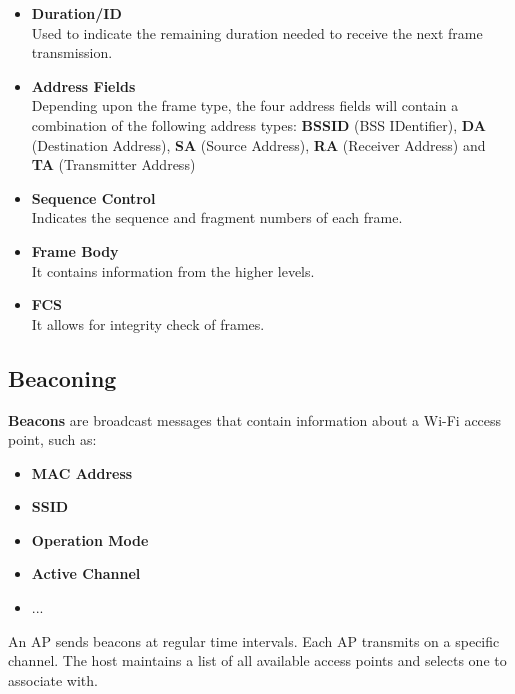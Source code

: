 \documentclass{article}
\begin{document}
\begin{itemize}
	\item \textbf{Duration/ID}
	\vspace{.2cm} \\
	Used to indicate the remaining duration needed to receive the next frame transmission.
	
	\item \textbf{Address Fields}
	\vspace{.2cm} \\
	Depending upon the frame type, the four address fields will contain a combination of the following address types: \textbf{BSSID} (BSS IDentifier), \textbf{DA} (Destination Address), \textbf{SA} (Source Address), \textbf{RA} (Receiver Address) and \textbf{TA} (Transmitter Address)
	
	\item \textbf{Sequence Control}
	\vspace{.2cm} \\
	Indicates the sequence and fragment numbers of each frame.
	
	\item \textbf{Frame Body}
	\vspace{.2cm} \\
	It contains information from the higher levels.
	
	\item \textbf{FCS}
	\vspace{.2cm} \\
	It allows for integrity check of frames.
\end{itemize}

\subsection{Beaconing}
\textbf{Beacons} are broadcast messages that contain information about a Wi-Fi access point, such as:

\begin{itemize}
	\item \textbf{MAC Address}
	\item \textbf{SSID}
	\item \textbf{Operation Mode}
	\item \textbf{Active Channel}
	\item ...
\end{itemize}
An AP sends beacons at regular time intervals. Each AP transmits on a specific channel. The host maintains a list of all available access points and selects one to associate with.
\end{document}

